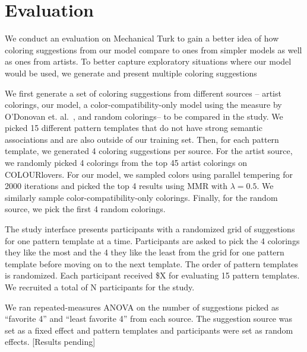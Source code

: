 \section{Evaluation}
\label{sec:evaluation}


We conduct an evaluation on Mechanical Turk to gain a better idea of how coloring suggestions from our model compare to ones from simpler models as well as ones from artists.
To better capture exploratory situations where our model would be used, we generate and present multiple coloring suggestions 

We first generate a set of coloring suggestions from different sources -- artist colorings, our model, a color-compatibility-only model using the measure by O'Donovan et. al.~, and random colorings-- to be compared in the study. We picked 15 different pattern templates that do not have strong semantic associations and are also outside of our training set. Then, for each pattern template, we generated 4 coloring suggestions per source. For the artist source, we randomly picked 4 colorings from the top 45 artist colorings on COLOURlovers. For our model, we sampled colors using parallel tempering for 2000 iterations and picked the top 4 results using MMR with $\lambda = 0.5$. We similarly sample color-compatibility-only colorings. Finally, for the random source, we pick the first 4 random colorings.

The study interface presents participants with a randomized grid of suggestions for one pattern template at a time. Participants are asked to pick the 4 colorings they like the most and the 4 they like the least from the grid for one pattern template before moving on to the next template. The order of pattern templates is randomized. Each participant received \$X for evaluating 15 pattern templates. We recruited a total of N participants for the study.

We ran repeated-measures ANOVA on the number of suggestions picked as ``favorite 4'' and ``least favorite 4'' from each source. The suggestion source was set as a fixed effect and pattern templates and participants were set as random effects. [Results pending]